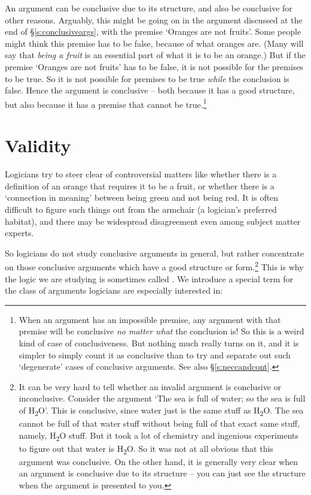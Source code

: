  An argument can be conclusive due to its structure, and also be conclusive for other reasons. Arguably, this might be going on in the argument discussed at the end of §\ref{s:conclusiveargs}, with the premise `Oranges are not fruits'. Some people might think this premise has to be false, because of what oranges are. (Many will say that \emph{being a fruit} is an essential part of what it is to be an orange.) But if the premise `Oranges are not fruits' has to be false, it is not possible for the premises to be true. So it is not possible for premises to be true \emph{while} the conclusion is false. Hence the argument is conclusive – both because it has a good structure, but also because it has a premise that cannot be true.\footnote{When an argument has an impossible premise, any argument with that premise will be conclusive \emph{no matter what} the conclusion is! So this is a weird kind of case of conclusiveness. But nothing much really turns on it, and it is simpler to simply count it as conclusive than to try and separate out such `degenerate' cases of conclusive arguments. See also §\ref{s:neccandcont}.}


\section{Validity}\label{s:validityintro}

Logicians try to steer clear of controversial matters like whether there is a definition of an orange that requires it to be a fruit, or whether there is a `connection in meaning' between being green and not being red. It is often difficult to figure such things out from the armchair (a logician's preferred habitat), and there may be widespread disagreement even among subject matter experts.

So logicians do not study conclusive arguments in general, but rather concentrate on those conclusive arguments which have a good structure or form.\footnote{It can be very hard to tell whether an invalid argument is conclusive or inconclusive. Consider the argument `The sea is full of water; so the sea is full of H\textsubscript{2}O'. This is conclusive, since water just is the same stuff as H\textsubscript{2}O. The sea cannot be full of that water stuff without being full of that exact same stuff, namely, H\textsubscript{2}O stuff. But it took a lot of chemistry and ingenious experiments to figure out that water is H\textsubscript{2}O. So it was not at all obvious that this argument was conclusive. On the other hand, it is generally very clear when an argument is conclusive due to its structure – you can just see the structure when the argument is presented to you.} This is why the logic we are studying is sometimes called . We introduce a special term for the class of arguments logicians are especially interested in:

